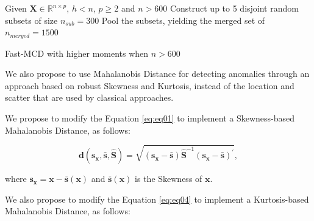 \documentclass[review]{elsarticle}
\begin{document}
\begin{algorithm}
	\label{alg:alg07}
	\scriptsize
	\SetAlgoLined
	Given $\boldsymbol{X} \in \mathbb{R}^{n \times p}$, $h < n$, $p \geq 2$ and $n > 600$\;
	Construct up to 5 disjoint random subsets of size $n_{sub} = 300$\;
	Pool the subsets, yielding the merged set of $n_{merged} = 1500$\;
	\caption{Fast-MCD with higher moments when $n > 600$}
\end{algorithm}

We also propose to use Mahalanobis Distance for detecting anomalies through an approach based on robust Skewness and Kurtosis, instead of the location and scatter that are used by classical approaches.

We propose to modify the Equation \ref{eq:eq01} to implement a Skewness-based Mahalanobis Distance, as follows:

\begin{equation}\label{eq:eq08}
	\boldsymbol{d}(\boldsymbol{s}_{\boldsymbol{x}}, \bar{\boldsymbol{s}}, \boldsymbol{\hat{S}}) = \sqrt{(\boldsymbol{s}_{\boldsymbol{x}} - \bar{\boldsymbol{s}}) \boldsymbol{\hat{S}}^{-1}(\boldsymbol{s}_{\boldsymbol{x}} - \bar{\boldsymbol{s}})^\prime}, 
\end{equation}

where $\boldsymbol{s}_{\boldsymbol{x}} = \boldsymbol{x} - \boldsymbol{\bar{s}}(\boldsymbol{x})$ and $\boldsymbol{\bar{s}}(\boldsymbol{x})$ is the Skewness of $\boldsymbol{x}$.

We also propose to modify the Equation \ref{eq:eq04} to implement a Kurtosis-based Mahalanobis Distance, as follows:
\end{document}
